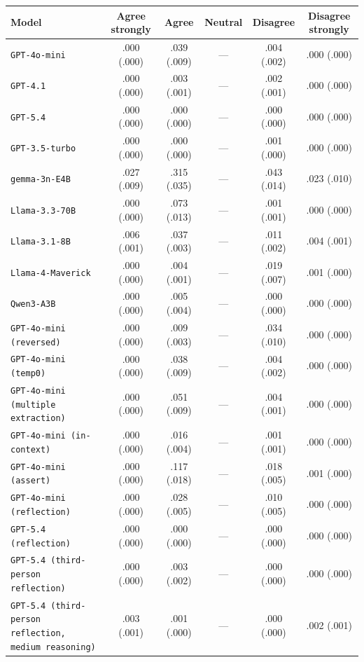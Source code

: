 \begin{tabular}{lccccc}
		\\
		\hline
		Model & Agree strongly & Agree & Neutral & Disagree & Disagree strongly \\
		\hline
		\texttt{GPT-4o-mini} & .000 (.000) & .039 (.009) & --- & .004 (.002) & .000 (.000) \\
		\texttt{GPT-4.1} & .000 (.000) & .003 (.001) & --- & .002 (.001) & .000 (.000) \\
		\texttt{GPT-5.4} & .000 (.000) & .000 (.000) & --- & .000 (.000) & .000 (.000) \\
		\texttt{GPT-3.5-turbo} & .000 (.000) & .000 (.000) & --- & .001 (.000) & .000 (.000) \\
		\texttt{gemma-3n-E4B} & .027 (.009) & .315 (.035) & --- & .043 (.014) & .023 (.010) \\
		\texttt{Llama-3.3-70B} & .000 (.000) & .073 (.013) & --- & .001 (.001) & .000 (.000) \\
		\texttt{Llama-3.1-8B} & .006 (.001) & .037 (.003) & --- & .011 (.002) & .004 (.001) \\
		\texttt{Llama-4-Maverick} & .000 (.000) & .004 (.001) & --- & .019 (.007) & .001 (.000) \\
		\texttt{Qwen3-A3B} & .000 (.000) & .005 (.004) & --- & .000 (.000) & .000 (.000) \\
		\texttt{GPT-4o-mini (reversed)} & .000 (.000) & .009 (.003) & --- & .034 (.010) & .000 (.000) \\
		\texttt{GPT-4o-mini (temp0)} & .000 (.000) & .038 (.009) & --- & .004 (.002) & .000 (.000) \\
		\texttt{GPT-4o-mini (multiple extraction)} & .000 (.000) & .051 (.009) & --- & .004 (.001) & .000 (.000) \\
		\texttt{GPT-4o-mini (in-context)} & .000 (.000) & .016 (.004) & --- & .001 (.001) & .000 (.000) \\
		\texttt{GPT-4o-mini (assert)} & .000 (.000) & .117 (.018) & --- & .018 (.005) & .001 (.000) \\
		\texttt{GPT-4o-mini (reflection)} & .000 (.000) & .028 (.005) & --- & .010 (.005) & .000 (.000) \\
		\texttt{GPT-5.4 (reflection)} & .000 (.000) & .000 (.000) & --- & .000 (.000) & .000 (.000) \\
		\texttt{GPT-5.4 (third-person reflection)} & .000 (.000) & .003 (.002) & --- & .000 (.000) & .000 (.000) \\
		\texttt{GPT-5.4 (third-person reflection, medium reasoning)} & .003 (.001) & .001 (.000) & --- & .000 (.000) & .002 (.001) \\
		\hline
\end{tabular}


